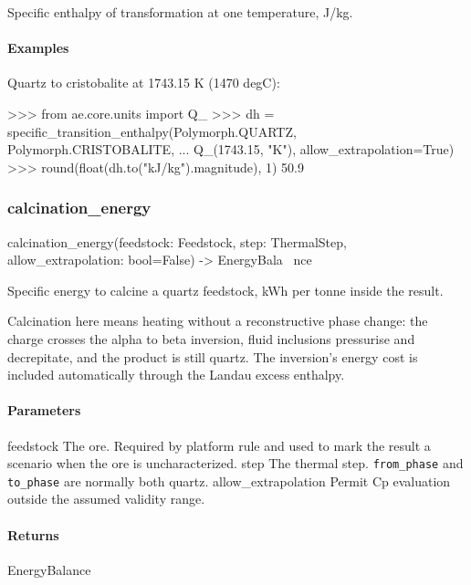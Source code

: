 \documentclass[10pt,a4paper,twoside]{report}
\begin{document}
Specific enthalpy of transformation at one temperature, J/kg.

\paragraph*{Examples}

Quartz to cristobalite at 1743.15 K (1470 degC):

\begin{doctestblock}
>>> from ae.core.units import Q_
>>> dh = specific_transition_enthalpy(Polymorph.QUARTZ, Polymorph.CRISTOBALITE,
...                                    Q_(1743.15, "K"), allow_extrapolation=True)
>>> round(float(dh.to("kJ/kg").magnitude), 1)
50.9
\end{doctestblock}

\subsubsection*{calcination\_energy}

\begin{verbatimsmall}
calcination_energy(feedstock: Feedstock, step: ThermalStep, allow_extrapolation: bool=False) -> EnergyBala
    \ nce
\end{verbatimsmall}

Specific energy to calcine a quartz feedstock, kWh per tonne inside the result.

Calcination here means heating without a reconstructive phase change: the charge crosses the alpha to beta inversion, fluid inclusions pressurise and decrepitate, and the product is still quartz. The inversion's energy cost is included automatically through the Landau excess enthalpy.

\paragraph*{Parameters}

feedstock The ore. Required by platform rule and used to mark the result a scenario when the ore is uncharacterized. step The thermal step. \texttt{from\_phase} and \texttt{to\_phase} are normally both quartz. allow\_extrapolation Permit Cp evaluation outside the assumed validity range.

\paragraph*{Returns}

EnergyBalance
\end{document}
